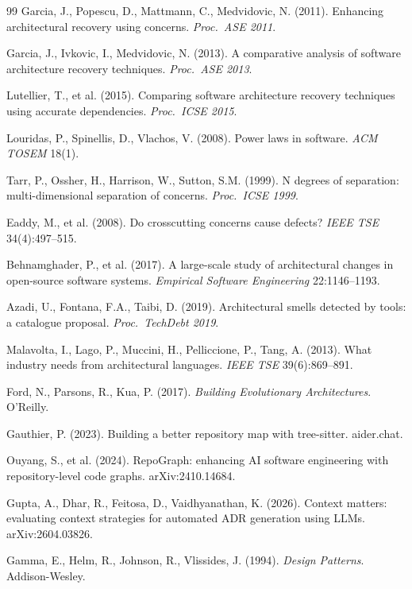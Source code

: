 \documentclass[11pt,oneside]{article}
\theoremstyle{definition}
\begin{document}
\begin{thebibliography}{99}
 Garcia, J., Popescu, D., Mattmann, C., Medvidovic, N. (2011). Enhancing
architectural recovery using concerns. \emph{Proc.\ ASE 2011}.

 Garcia, J., Ivkovic, I., Medvidovic, N. (2013). A comparative analysis of
software architecture recovery techniques. \emph{Proc.\ ASE 2013}.

 Lutellier, T., et al. (2015). Comparing software architecture recovery
techniques using accurate dependencies. \emph{Proc.\ ICSE 2015}.

 Louridas, P., Spinellis, D., Vlachos, V. (2008). Power laws in software.
\emph{ACM TOSEM} 18(1).

 Tarr, P., Ossher, H., Harrison, W., Sutton, S.M. (1999). N degrees of
separation: multi-dimensional separation of concerns. \emph{Proc.\ ICSE 1999}.

 Eaddy, M., et al. (2008). Do crosscutting concerns cause defects? \emph{IEEE
TSE} 34(4):497--515.

 Behnamghader, P., et al. (2017). A large-scale study of architectural
changes in open-source software systems. \emph{Empirical Software Engineering} 22:1146--1193.

 Azadi, U., Fontana, F.A., Taibi, D. (2019). Architectural smells detected by
tools: a catalogue proposal. \emph{Proc.\ TechDebt 2019}.

 Malavolta, I., Lago, P., Muccini, H., Pelliccione, P., Tang, A. (2013).
What industry needs from architectural languages. \emph{IEEE TSE} 39(6):869--891.

 Ford, N., Parsons, R., Kua, P. (2017). \emph{Building Evolutionary
Architectures}. O'Reilly.

 Gauthier, P. (2023). Building a better repository map with tree-sitter.
aider.chat.

 Ouyang, S., et al. (2024). RepoGraph: enhancing AI software engineering
with repository-level code graphs. arXiv:2410.14684.

 Gupta, A., Dhar, R., Feitosa, D., Vaidhyanathan, K. (2026). Context
matters: evaluating context strategies for automated ADR generation using LLMs. arXiv:2604.03826.

 Gamma, E., Helm, R., Johnson, R., Vlissides, J. (1994). \emph{Design
Patterns}. Addison-Wesley.


\end{thebibliography}
\end{document}
